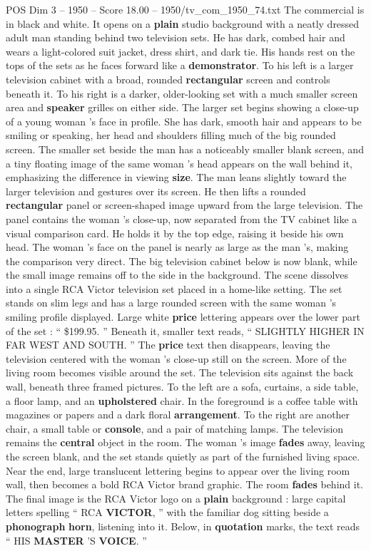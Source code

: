\begin{textsample}{POS Dim 3 – 1950 – Score 18.00 – 1950/tv\_com\_1950\_74.txt}  \label{ex:f3_pos_004}
The commercial is in black and white.
It opens on a \textbf{plain} studio background with a neatly dressed adult man standing behind two television sets.
He has dark, combed hair and wears a light-colored suit jacket, dress shirt, and dark tie.
His hands rest on the tops of the sets as he faces forward like a \textbf{demonstrator}.
To his left is a larger television cabinet with a broad, rounded \textbf{rectangular} screen and controls beneath it.
To his right is a darker, older-looking set with a much smaller screen area and \textbf{speaker} grilles on either side.
The larger set begins showing a close-up of a young woman ’s face in profile.
She has dark, smooth hair and appears to be smiling or speaking, her head and shoulders filling much of the big rounded screen.
The smaller set beside the man has a noticeably smaller blank screen, and a tiny floating image of the same woman ’s head appears on the wall behind it, emphasizing the difference in viewing \textbf{size}.
The man leans slightly toward the larger television and gestures over its screen.
He then lifts a rounded \textbf{rectangular} panel or screen-shaped image upward from the large television.
The panel contains the woman ’s close-up, now separated from the TV cabinet like a visual comparison card.
He holds it by the top edge, raising it beside his own head.
The woman ’s face on the panel is nearly as large as the man ’s, making the comparison very direct.
The big television cabinet below is now blank, while the small image remains off to the side in the background.
The scene dissolves into a single RCA Victor television set placed in a home-like setting.
The set stands on slim legs and has a large rounded screen with the same woman ’s smiling profile displayed.
Large white \textbf{price} lettering appears over the lower part of the set : “ \$199.95. ” Beneath it, smaller text reads, “ SLIGHTLY HIGHER IN FAR WEST AND SOUTH. ” The \textbf{price} text then disappears, leaving the television centered with the woman ’s close-up still on the screen.
More of the living room becomes visible around the set.
The television sits against the back wall, beneath three framed pictures.
To the left are a sofa, curtains, a side table, a floor lamp, and an \textbf{upholstered} chair.
In the foreground is a coffee table with magazines or papers and a dark floral \textbf{arrangement}.
To the right are another chair, a small table or \textbf{console}, and a pair of matching lamps.
The television remains the \textbf{central} object in the room.
The woman ’s image \textbf{fades} away, leaving the screen blank, and the set stands quietly as part of the furnished living space.
Near the end, large translucent lettering begins to appear over the living room wall, then becomes a bold RCA Victor brand graphic.
The room \textbf{fades} behind it.
The final image is the RCA Victor logo on a \textbf{plain} background : large capital letters spelling “ RCA \textbf{VICTOR}, ” with the familiar dog sitting beside a \textbf{phonograph} \textbf{horn}, listening into it.
Below, in \textbf{quotation} marks, the text reads “ HIS \textbf{MASTER} ’S \textbf{VOICE}. ”


\end{textsample}
